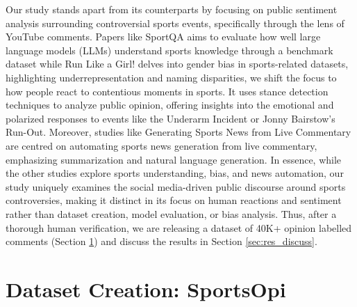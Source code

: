 \documentclass[sigconf, review]{acmart}
\begin{document}
Our study stands apart from its counterparts by focusing on public sentiment analysis surrounding controversial sports events, specifically through the lens of YouTube comments. Papers like SportQA \cite{xia-etal-2024-sportqa} aims to evaluate how well large language models (LLMs) understand sports knowledge through a benchmark dataset while Run Like a Girl! \cite{harrison-etal-2023-run} delves into gender bias in sports-related datasets, highlighting underrepresentation and naming disparities, we shift the focus to how people react to contentious moments in sports. It uses stance detection techniques to analyze public opinion, offering insights into the emotional and polarized responses to events like the Underarm Incident or Jonny Bairstow’s Run-Out. Moreover, studies like Generating Sports News from Live Commentary \cite{huang-etal-2020-generating} are centred on automating sports news generation from live commentary, emphasizing summarization and natural language generation. In essence, while the other studies explore sports understanding, bias, and news automation, our study uniquely examines the social media-driven public discourse around sports controversies, making it distinct in its focus on human reactions and sentiment rather than dataset creation, model evaluation, or bias analysis. Thus, after a thorough human verification, we are releasing a dataset of 40K+ opinion labelled comments (Section \ref{sec:dataset}) and discuss the results in Section \ref{sec:res_discuss}. 




\section{Dataset Creation: SportsOpi}\label{sec:dataset}
\end{document}
